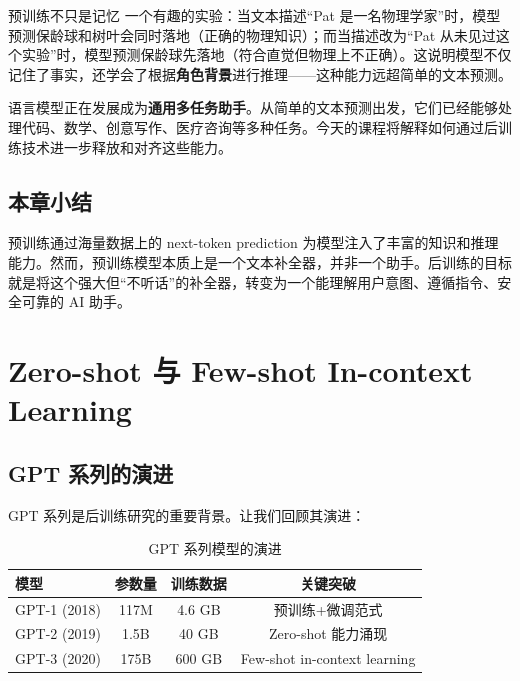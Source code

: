 \documentclass[a4paper]{article}
\begin{document}
\begin{knowledgebox}{预训练不只是记忆}
一个有趣的实验：当文本描述``Pat 是一名物理学家''时，模型预测保龄球和树叶会同时落地（正确的物理知识）；而当描述改为``Pat 从未见过这个实验''时，模型预测保龄球先落地（符合直觉但物理上不正确）。这说明模型不仅记住了事实，还学会了根据\textbf{角色背景}进行推理——这种能力远超简单的文本预测。
\end{knowledgebox}





语言模型正在发展成为\textbf{通用多任务助手}。从简单的文本预测出发，它们已经能够处理代码、数学、创意写作、医疗咨询等多种任务。今天的课程将解释如何通过后训练技术进一步释放和对齐这些能力。

\subsection{本章小结}

预训练通过海量数据上的 next-token prediction 为模型注入了丰富的知识和推理能力。然而，预训练模型本质上是一个文本补全器，并非一个助手。后训练的目标就是将这个强大但``不听话''的补全器，转变为一个能理解用户意图、遵循指令、安全可靠的 AI 助手。


\section{Zero-shot 与 Few-shot In-context Learning}

\subsection{GPT 系列的演进}

GPT 系列是后训练研究的重要背景。让我们回顾其演进：

\begin{table}[H]
\centering
\begin{tabular}{lccc}
\toprule
\textbf{模型} & \textbf{参数量} & \textbf{训练数据} & \textbf{关键突破} \\
\midrule
GPT-1 (2018) & 117M & 4.6 GB & 预训练+微调范式 \\
GPT-2 (2019) & 1.5B & 40 GB & Zero-shot 能力涌现 \\
GPT-3 (2020) & 175B & 600 GB & Few-shot in-context learning \\
\bottomrule
\end{tabular}
\caption{GPT 系列模型的演进}
\end{table}
\end{document}
